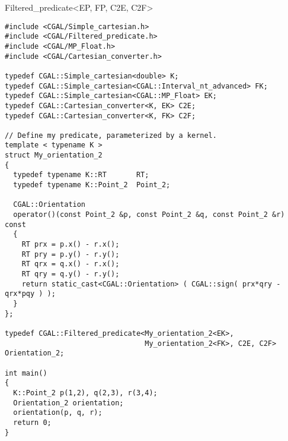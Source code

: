 \begin{ccRefClass}{Filtered_predicate<EP, FP, C2E, C2F>}
\begin{verbatim}
#include <CGAL/Simple_cartesian.h>
#include <CGAL/Filtered_predicate.h>
#include <CGAL/MP_Float.h>
#include <CGAL/Cartesian_converter.h>

typedef CGAL::Simple_cartesian<double> K;
typedef CGAL::Simple_cartesian<CGAL::Interval_nt_advanced> FK;
typedef CGAL::Simple_cartesian<CGAL::MP_Float> EK;
typedef CGAL::Cartesian_converter<K, EK> C2E;
typedef CGAL::Cartesian_converter<K, FK> C2F;

// Define my predicate, parameterized by a kernel.
template < typename K >
struct My_orientation_2
{
  typedef typename K::RT       RT;
  typedef typename K::Point_2  Point_2;

  CGAL::Orientation
  operator()(const Point_2 &p, const Point_2 &q, const Point_2 &r) const
  {
    RT prx = p.x() - r.x();
    RT pry = p.y() - r.y();
    RT qrx = q.x() - r.x();
    RT qry = q.y() - r.y();
    return static_cast<CGAL::Orientation> ( CGAL::sign( prx*qry - qrx*pqy ) );
  }
};

typedef CGAL::Filtered_predicate<My_orientation_2<EK>,
                                 My_orientation_2<FK>, C2E, C2F> Orientation_2;

int main()
{
  K::Point_2 p(1,2), q(2,3), r(3,4);
  Orientation_2 orientation;
  orientation(p, q, r);
  return 0;
}
\end{verbatim}

\end{ccRefClass}
